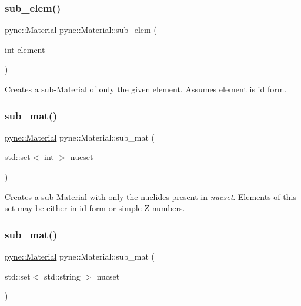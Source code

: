 \subsubsection{\texorpdfstring{sub\+\_\+elem()}{sub\_elem()}}
{\footnotesize\ttfamily \hyperlink{classpyne_1_1_material}{pyne\+::\+Material} pyne\+::\+Material\+::sub\+\_\+elem (\begin{DoxyParamCaption}\item[{int}]{element }\end{DoxyParamCaption})}

Creates a sub-\/\+Material of only the given element. Assumes element is id form. \mbox{\label{classpyne_1_1_material_a50c2deb6e8513bfb101c5b2992e7f5dc}} 
\subsubsection{\texorpdfstring{sub\+\_\+mat()}{sub\_mat()}\hspace{0.1cm}{\footnotesize\ttfamily [1/2]}}
{\footnotesize\ttfamily \hyperlink{classpyne_1_1_material}{pyne\+::\+Material} pyne\+::\+Material\+::sub\+\_\+mat (\begin{DoxyParamCaption}\item[{std\+::set$<$ int $>$}]{nucset }\end{DoxyParamCaption})}

Creates a sub-\/\+Material with only the nuclides present in {\itshape nucset}. Elements of this set may be either in id form or simple Z numbers. \mbox{\label{classpyne_1_1_material_a7cd9de1e2a7a80b5beb4946667823b68}} 
\subsubsection{\texorpdfstring{sub\+\_\+mat()}{sub\_mat()}\hspace{0.1cm}{\footnotesize\ttfamily [2/2]}}
{\footnotesize\ttfamily \hyperlink{classpyne_1_1_material}{pyne\+::\+Material} pyne\+::\+Material\+::sub\+\_\+mat (\begin{DoxyParamCaption}\item[{std\+::set$<$ std\+::string $>$}]{nucset }\end{DoxyParamCaption})}

